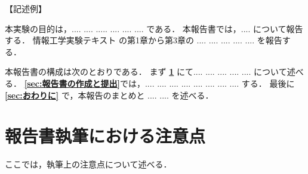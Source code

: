 \documentclass{jarticle}[11pt]
\begin{document}
\noindent
【記述例】

本実験の目的は，.... .... ..... .... .... .... である．
本報告書では，.... について報告する．
情報工学実験テキスト \cite{bib:実験テキスト} の第1章から第3章の
.... .... .... .... .... を報告する．

本報告書の構成は次のとおりである．
まず 
{\bf \ref{sec:報告書執筆における注意点}} にて.... .... .... .... .... 
について述べる．
{\bf \ref{sec:報告書の作成と提出}}では，.... .... .... .... .... .... 
.... .... する．
最後に {\bf \ref{sec:おわりに}} で，本報告のまとめと
.... .... を述べる．

\section{報告書執筆における注意点}
\label{sec:報告書執筆における注意点}

ここでは，執筆上の注意点について述べる．
\end{document}
